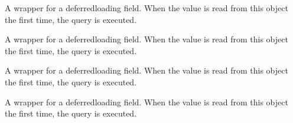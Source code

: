 \documentclass[a4paper,11pt,spanish]{sphinxmanual}
\begin{document}
\begin{fulllineitems}
\begin{fulllineitems}
\end{fulllineitems}


\begin{fulllineitems}
\label{\detokenize{api/supplier/supplier.models:supplier.models.Supplier.age}}
\pysigstartsignatures
\pysigline
{}
\pysigstopsignatures
\sphinxAtStartPar
A wrapper for a deferred\sphinxhyphen{}loading field. When the value is read from this
object the first time, the query is executed.

\end{fulllineitems}


\begin{fulllineitems}
\label{\detokenize{api/supplier/supplier.models:supplier.models.Supplier.city}}
\pysigstartsignatures
\pysigline
{}
\pysigstopsignatures
\sphinxAtStartPar
A wrapper for a deferred\sphinxhyphen{}loading field. When the value is read from this
object the first time, the query is executed.

\end{fulllineitems}


\begin{fulllineitems}
\label{\detokenize{api/supplier/supplier.models:supplier.models.Supplier.country}}
\pysigstartsignatures
\pysigline
{}
\pysigstopsignatures
\sphinxAtStartPar
A wrapper for a deferred\sphinxhyphen{}loading field. When the value is read from this
object the first time, the query is executed.

\end{fulllineitems}


\begin{fulllineitems}
\label{\detokenize{api/supplier/supplier.models:supplier.models.Supplier.created_at}}
\pysigstartsignatures
\pysigline
{}
\pysigstopsignatures
\sphinxAtStartPar
A wrapper for a deferred\sphinxhyphen{}loading field. When the value is read from this
object the first time, the query is executed.


\end{fulllineitems}
\end{fulllineitems}
\end{document}
